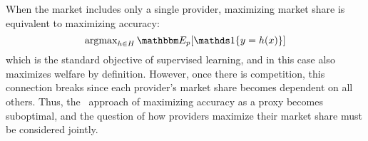 When the market includes only a single provider,
maximizing market share is equivalent to maximizing accuracy:
\begin{equation}
\label{eq:exp_accuracy}
\argmax\nolimits_{h \in H} \expect{p}{\one{y=h(x)}}
\end{equation}
which is the standard objective of supervised learning,
and in this case also maximizes welfare by definition.
However, once there is competition,
this connection breaks since
each provider's market share becomes dependent on all others.
Thus, the \naive\ approach of maximizing accuracy
as a proxy
becomes suboptimal,
and the question of how providers maximize their market share
must be considered 
jointly.
\squeeze










